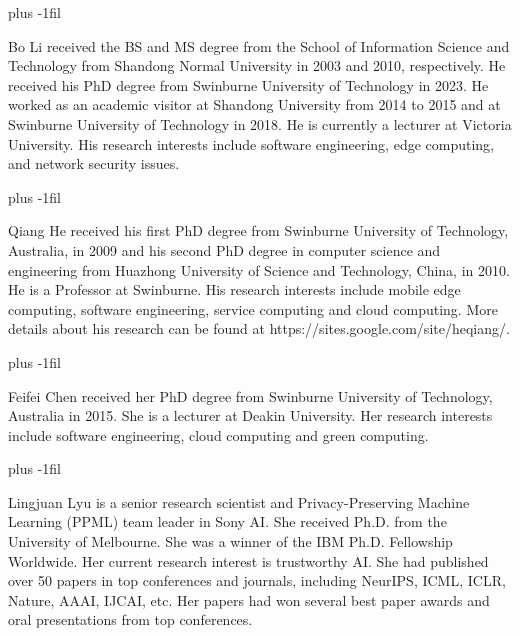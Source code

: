 \documentclass[10pt,journal,compsoc]{IEEEtran}
\begin{document}





 
\baselineskip plus -1fil
\begin{IEEEbiography}{Bo Li} received the BS and MS degree from the School of Information Science and Technology from Shandong Normal University in 2003 and 2010, respectively. He received his PhD degree from Swinburne University of Technology in 2023. He worked as an academic visitor at Shandong University from 2014 to 2015 and at Swinburne University of Technology in 2018. He is currently a lecturer at Victoria University. His research interests include software engineering, edge computing, and network security issues.
\end{IEEEbiography}

\baselineskip plus -1fil
\begin{IEEEbiography}{Qiang He} received his first PhD degree from Swinburne University of Technology, Australia, in 2009 and his second PhD degree in computer science and engineering from Huazhong University of Science and Technology, China, in 2010. He is a Professor at Swinburne. His research interests include mobile edge computing, software engineering, service computing and cloud computing. More details about his research can be found at https://sites.google.com/site/heqiang/.
\end{IEEEbiography}

\baselineskip plus -1fil
\begin{IEEEbiography}{Feifei Chen} received her PhD degree from Swinburne University of Technology, Australia in 2015. She is a lecturer at Deakin University. Her research interests include software engineering, cloud computing and green computing.
\end{IEEEbiography}


\baselineskip plus -1fil
\begin{IEEEbiography}{Lingjuan Lyu} is a senior research scientist and Privacy-Preserving Machine Learning (PPML) team leader in Sony AI. She received Ph.D. from the University of Melbourne. She was a winner of the IBM Ph.D. Fellowship Worldwide. Her current research interest is trustworthy AI. She had published over 50 papers in top conferences and journals, including NeurIPS, ICML, ICLR, Nature, AAAI, IJCAI, etc. Her papers had won several best paper awards and oral presentations from top conferences.
\end{IEEEbiography}
\end{document}
